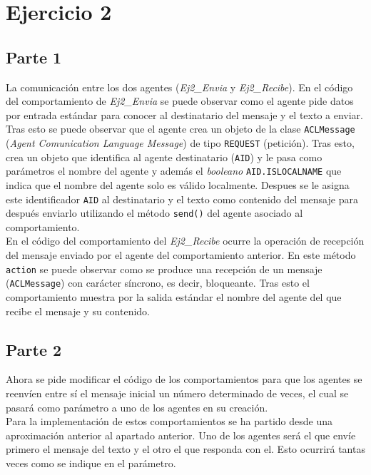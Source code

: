 \documentclass[10pt,a4paper]{article}
\begin{document}
\newpage
\section{Ejercicio 2}

\subsection{Parte 1}

La comunicación entre los dos agentes (\emph{Ej2\_{}Envia} y \emph{Ej2\_{}Recibe}). 
En el código del comportamiento de \emph{Ej2\_{}Envia} se puede observar como el agente pide datos por entrada estándar para conocer al destinatario del mensaje y el texto a enviar. Tras esto se puede observar que el agente crea un objeto de la clase \texttt{ACLMessage} (\emph{Agent Comunication Language Message}) de tipo \texttt{REQUEST} (petición). Tras esto, crea un objeto que identifica al agente destinatario (\texttt{AID}) y le pasa como parámetros el nombre del agente y además el \emph{booleano} \texttt{AID.ISLOCALNAME} que indica que el nombre del agente solo es válido localmente. Despues se le asigna este identificador \texttt{AID} al destinatario y el texto como contenido del mensaje para después enviarlo utilizando el método \texttt{send()} del agente asociado al comportamiento.\\

En el código del comportamiento del \emph{Ej2\_{}Recibe} ocurre la operación de recepción del mensaje enviado por el agente del comportamiento anterior. En este método \texttt{action} se puede observar como se produce una recepción de un mensaje (\texttt{ACLMessage}) con carácter síncrono, es decir, bloqueante. Tras esto el comportamiento muestra por la salida estándar el nombre del agente del que recibe el mensaje y su contenido.\\

\subsection{Parte 2}

Ahora se pide modificar el código de los comportamientos para que los agentes se reenvíen entre sí el mensaje inicial un número determinado de veces, el cual se pasará como parámetro a uno de los agentes en su creación.\\
Para la implementación de estos comportamientos se ha partido desde una aproximación anterior al apartado anterior. Uno de los agentes será el que envíe primero el mensaje del texto y el otro el que responda con el. Esto ocurrirá tantas veces como se indique en el parámetro.\\
\end{document}
